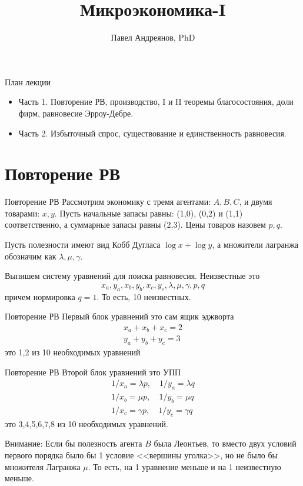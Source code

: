 \documentclass{beamer}
\title{
Микроэкономика-I
}
\author{
Павел Андреянов, PhD
}
\begin{document}
\maketitle

\begin{frame}{План лекции}
\begin{itemize}
  \item Часть 1. Повторение РВ, производство, I и II теоремы благосостояния, доли фирм, равновесие Эрроу-Дебре.
  \item Часть 2. Избыточный спрос, существование и единственность равновесия.
\end{itemize}
\end{frame}

\section{Повторение РВ}
\begin{frame}{Повторение РВ}
Рассмотрим экономику с тремя агентами: $A,B,C$, и двумя товарами: $x, y$.
Пусть начальные запасы равны: (1,0), (0,2) и (1,1) соответственно, а суммарные запасы равны (2,3). Цены товаров назовем $p,q$.

Пусть полезности имеют вид Кобб Дугласа $\log x + \log y$, а множители лагранжа обозначим как $\lambda, \mu, \gamma$.

Выпишем систему уравнений для поиска равновесия. Неизвестные это
$$x_a, y_a, x_b, y_b, x_c, y_c, \lambda, \mu, \gamma, p,q$$
причем нормировка $q = 1$. То есть, 10 неизвестных.
\end{frame}

\begin{frame}{Повторение РВ}
Первый блок уравнений это сам ящик эджворта
\begin{gather*}
	x_a + x_b + x_c = 2\\
	y_a + y_b + y_c = 3
\end{gather*}
это 1,2 из 10 необходимых уравнений
\end{frame}

\begin{frame}{Повторение РВ}
Второй блок уравнений это УПП
\begin{gather*}
	1/x_a = \lambda p, \quad 1/y_a = \lambda q\\
	1/x_b = \mu p, \quad 1/y_b = \mu q\\
	1/x_c = \gamma p, \quad 1/y_c = \gamma q
\end{gather*}
это 3,4,5,6,7,8 из 10 необходимых уравнений.

\alert{Внимание:} Если бы полезность агента $B$ была Леонтьев, то вместо двух условий первого порядка было бы 1 условие <<вершины уголка>>, но не было бы множителя Лагранжа $\mu$. То есть, на 1 уравнение меньше и на 1 неизвестную меньше.

\end{frame}
\end{document}
